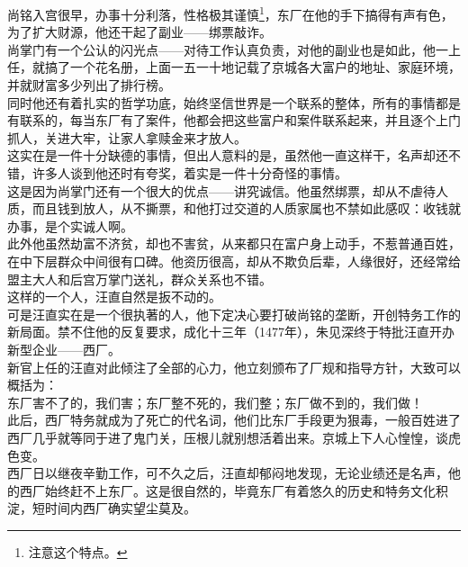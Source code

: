 \begin{multicols}{\theparacolNo}
尚铭入宫很早，办事十分利落，性格极其谨慎\footnote{注意这个特点。}，东厂在他的手下搞得有声有色，为了扩大财源，他还干起了副业——绑票敲诈。\\

尚掌门有一个公认的闪光点——对待工作认真负责，对他的副业也是如此，他一上任，就搞了一个花名册，上面一五一十地记载了京城各大富户的地址、家庭环境，并就财富多少列出了排行榜。\\

同时他还有着扎实的哲学功底，始终坚信世界是一个联系的整体，所有的事情都是有联系的，每当东厂有了案件，他都会把这些富户和案件联系起来，并且逐个上门抓人，关进大牢，让家人拿赎金来才放人。\\

这实在是一件十分缺德的事情，但出人意料的是，虽然他一直这样干，名声却还不错，许多人谈到他还时有夸奖，着实是一件十分奇怪的事情。\\

这是因为尚掌门还有一个很大的优点——讲究诚信。他虽然绑票，却从不虐待人质，而且钱到放人，从不撕票，和他打过交道的人质家属也不禁如此感叹：收钱就办事，是个实诚人啊。\\

此外他虽然劫富不济贫，却也不害贫，从来都只在富户身上动手，不惹普通百姓，在中下层群众中间很有口碑。他资历很高，却从不欺负后辈，人缘很好，还经常给盟主大人和后宫万掌门送礼，群众关系也不错。\\

这样的一个人，汪直自然是扳不动的。\\

可是汪直实在是一个很执著的人，他下定决心要打破尚铭的垄断，开创特务工作的新局面。禁不住他的反复要求，成化十三年（1477年），朱见深终于特批汪直开办新型企业——西厂。\\

新官上任的汪直对此倾注了全部的心力，他立刻颁布了厂规和指导方针，大致可以概括为：\\

东厂害不了的，我们害；东厂整不死的，我们整；东厂做不到的，我们做！\\

此后，西厂特务就成为了死亡的代名词，他们比东厂手段更为狠毒，一般百姓进了西厂几乎就等同于进了鬼门关，压根儿就别想活着出来。京城上下人心惶惶，谈虎色变。\\

西厂日以继夜辛勤工作，可不久之后，汪直却郁闷地发现，无论业绩还是名声，他的西厂始终赶不上东厂。这是很自然的，毕竟东厂有着悠久的历史和特务文化积淀，短时间内西厂确实望尘莫及。\\


\end{multicols}
